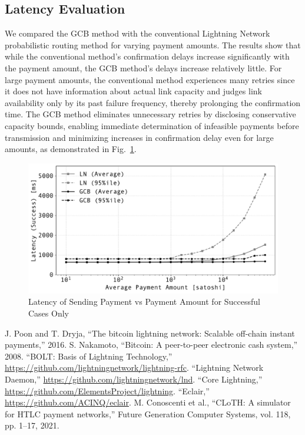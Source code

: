 \documentclass[conference]{IEEEtran}
\begin{document}
\subsection{Latency Evaluation}

We compared the GCB method with the conventional Lightning Network probabilistic routing method for varying payment amounts.
The results show that while the conventional method's confirmation delays increase significantly with the payment amount, the GCB method's delays increase relatively little.
For large payment amounts, the conventional method experiences many retries since it does not have information about actual link capacity and judges link availability only by its past failure frequency, thereby prolonging the confirmation time.
The GCB method eliminates unnecessary retries by disclosing conservative capacity bounds, enabling immediate determination of infeasible payments before transmission and minimizing increases in confirmation delay even for large amounts, as demonstrated in Fig.~\ref{fig:pmt_amt_vs_time}.

\begin{figure}[htbp]
	\centerline{\includegraphics[width=\linewidth]{fig/pmt_amt_vs_time}}
	\caption{Latency of Sending Payment vs Payment Amount for Successful Cases Only}
	\label{fig:pmt_amt_vs_time}
\end{figure}

\begin{thebibliography}{00}
	 J. Poon and T. Dryja, ``The bitcoin lightning network: Scalable off-chain instant payments,'' 2016.
	 S. Nakamoto, ``Bitcoin: A peer-to-peer electronic cash system,'' 2008.
	 ``BOLT: Basis of Lightning Technology,'' \url{https://github.com/lightningnetwork/lightning-rfc}.
	 ``Lightning Network Daemon,'' \url{https://github.com/lightningnetwork/lnd}.
	 ``Core Lightning,'' \url{https://github.com/ElementsProject/lightning}.
	 ``Eclair,'' \url{https://github.com/ACINQ/eclair}.
	 M. Conoscenti et al., ``CLoTH: A simulator for HTLC payment networks,'' Future Generation Computer Systems, vol. 118, pp. 1--17, 2021.
\end{thebibliography}
\end{document}
